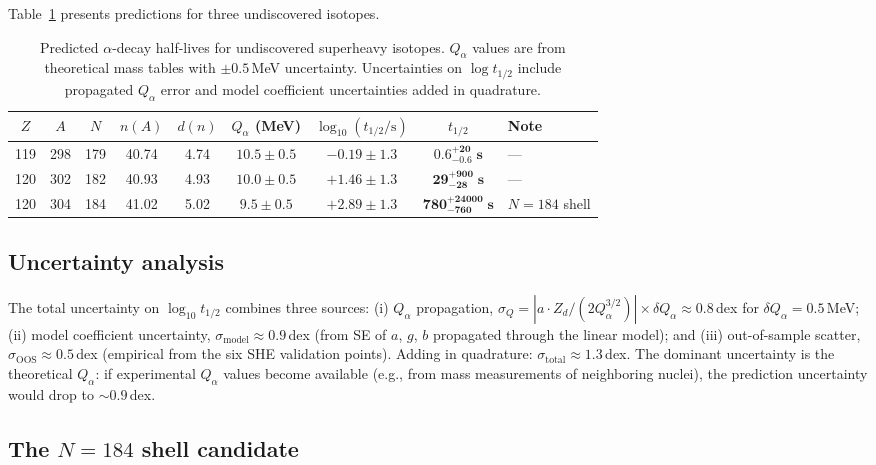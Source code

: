 \documentclass[aps,prc,twocolumn,showpacs,preprintnumbers,amsmath,amssymb]{revtex4-2}
\newcommand{\thalf}{t_{1/2}}
\newcommand{\Qalpha}{Q_\alpha}
\newcommand{\Zd}{Z_d}
\newcommand{\dn}{d(n)}
\begin{document}
Table~\ref{tab:predictions} presents predictions for three
undiscovered isotopes.

\begin{table}[t]
\centering
\caption{Predicted $\alpha$-decay half-lives for undiscovered
  superheavy isotopes.  $\Qalpha$ values are from theoretical
  mass tables with $\pm 0.5$\,MeV uncertainty.  Uncertainties
  on $\log\thalf$ include propagated $\Qalpha$ error and model
  coefficient uncertainties added in quadrature.}
\label{tab:predictions}
\begin{tabular}{@{}ccccccccl@{}}
\toprule
$Z$ & $A$ & $N$ & $n(A)$ & $\dn$ &
  $\Qalpha$ (MeV) & $\log_{10}(\thalf/\text{s})$ &
  $\thalf$ & Note \\
\midrule
119 & 298 & 179 & 40.74 & 4.74 & $10.5 \pm 0.5$ &
  $-0.19 \pm 1.3$ & $\mathbf{0.6^{+20}_{-0.6}\;\text{s}}$ & --- \\[3pt]
120 & 302 & 182 & 40.93 & 4.93 & $10.0 \pm 0.5$ &
  $+1.46 \pm 1.3$ & $\mathbf{29^{+900}_{-28}\;\text{s}}$ & --- \\[3pt]
120 & 304 & 184 & 41.02 & 5.02 & $9.5 \pm 0.5$ &
  $+2.89 \pm 1.3$ & $\mathbf{780^{+24000}_{-760}\;\text{s}}$ &
  $N = 184$ shell \\
\bottomrule
\end{tabular}
\end{table}

\subsection{Uncertainty analysis}

The total uncertainty on $\log_{10}\thalf$ combines three sources:
(i) $\Qalpha$ propagation,
  $\sigma_Q = |a \cdot \Zd / (2 \Qalpha^{3/2})| \times
  \delta\Qalpha \approx 0.8$\,dex for $\delta\Qalpha = 0.5$\,MeV;
(ii) model coefficient uncertainty,
  $\sigma_{\mathrm{model}} \approx 0.9$\,dex (from SE of $a$, $g$,
  $b$ propagated through the linear model); and
(iii) out-of-sample scatter,
  $\sigma_{\mathrm{OOS}} \approx 0.5$\,dex (empirical from the
  six SHE validation points).
Adding in quadrature:
$\sigma_{\mathrm{total}} \approx 1.3$\,dex.
The dominant uncertainty is the theoretical $\Qalpha$: if
experimental $\Qalpha$ values become available (e.g., from
mass measurements of neighboring nuclei), the prediction
uncertainty would drop to $\sim 0.9$\,dex.

\subsection{The $N = 184$ shell candidate}
\end{document}
